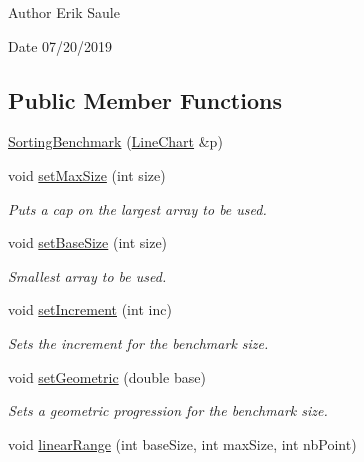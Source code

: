 \begin{DoxyAuthor}{Author}
Erik Saule 
\end{DoxyAuthor}
\begin{DoxyDate}{Date}
07/20/2019 
\end{DoxyDate}
\subsection*{Public Member Functions}
\begin{DoxyCompactItemize}
\item 
\mbox{\hyperlink{classbridges_1_1benchmark_1_1_sorting_benchmark_aed5731a3b5add3a7f4c80891b22b3093}{Sorting\+Benchmark}} (\mbox{\hyperlink{classbridges_1_1datastructure_1_1_line_chart}{Line\+Chart}} \&p)
\item 
void \mbox{\hyperlink{classbridges_1_1benchmark_1_1_sorting_benchmark_abdca289b823c7f240b648e248c07b059}{set\+Max\+Size}} (int size)
\begin{DoxyCompactList}\small\item\em Puts a cap on the largest array to be used. \end{DoxyCompactList}\item 
void \mbox{\hyperlink{classbridges_1_1benchmark_1_1_sorting_benchmark_afe0474d148c185ed1e479ff11f42ae51}{set\+Base\+Size}} (int size)
\begin{DoxyCompactList}\small\item\em Smallest array to be used. \end{DoxyCompactList}\item 
void \mbox{\hyperlink{classbridges_1_1benchmark_1_1_sorting_benchmark_ae168533dc5756f3ede3436bdd7840047}{set\+Increment}} (int inc)
\begin{DoxyCompactList}\small\item\em Sets the increment for the benchmark size. \end{DoxyCompactList}\item 
void \mbox{\hyperlink{classbridges_1_1benchmark_1_1_sorting_benchmark_ade76a5749b07d35b02623cce27c046ab}{set\+Geometric}} (double base)
\begin{DoxyCompactList}\small\item\em Sets a geometric progression for the benchmark size. \end{DoxyCompactList}\item 
void \mbox{\hyperlink{classbridges_1_1benchmark_1_1_sorting_benchmark_a993de51c8b82ec50eb186afef5dc7003}{linear\+Range}} (int base\+Size, int max\+Size, int nb\+Point)

\end{DoxyCompactItemize}
